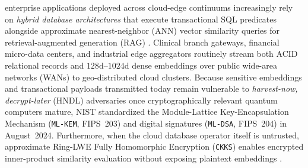 \documentclass[10pt,journal,compsoc]{IEEEtran}
\begin{document}
\maketitle
\IEEEdisplaynontitleabstractindextext
\IEEEpeerreviewmaketitle

 enterprise applications deployed across cloud-edge continuums increasingly rely on \emph{hybrid database architectures} that execute transactional SQL predicates alongside approximate nearest-neighbor (ANN) vector similarity queries for retrieval-augmented generation (RAG) \cite{wang2021milvus,zhang2023vbase,pan2024survey_vectordb,douze2024faiss}. Clinical branch gateways, financial micro-data centers, and industrial edge aggregators routinely stream both ACID relational records and $128\text{d}$--$1024\text{d}$ dense embeddings \cite{jegou2011sift,chen2024bgem3} over public wide-area networks (WANs) to geo-distributed cloud clusters. Because sensitive embeddings and transactional payloads transmitted today remain vulnerable to \emph{harvest-now, decrypt-later} (HNDL) adversaries once cryptographically relevant quantum computers mature, NIST standardized the Module-Lattice Key-Encapsulation Mechanism (\texttt{ML-KEM}, FIPS~203) \cite{nist_fips203_2024,bos2018kyber} and digital signatures (\texttt{ML-DSA}, FIPS~204) \cite{nist_fips204_2024} in August~2024. Furthermore, when the cloud database operator itself is untrusted, approximate Ring-LWE Fully Homomorphic Encryption (\texttt{CKKS}) \cite{cheon2017ckks,albadawi2022openfhe} enables encrypted inner-product similarity evaluation without exposing plaintext embeddings \cite{engelsma2022hers}.
\end{document}
